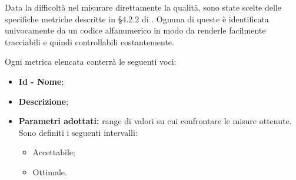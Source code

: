 Data la difficoltà nel misurare direttamente la qualità, sono state scelte delle specifiche metriche descritte in §4.2.2 di \NdP. 
Ognuna di queste è identificata univocamente da un codice alfanumerico in modo da renderle facilmente tracciabili e quindi controllabili costantemente.

Ogni metrica elencata conterrà le seguenti voci:
\begin{itemize}
	\item \textbf{Id - Nome};
	\item \textbf{Descrizione};
	\item \textbf{Parametri adottati: }range di valori su cui confrontare le misure ottenute. Sono definiti i seguenti intervalli:
	\begin{itemize}
		\item Accettabile;
		\item Ottimale.
	\end{itemize}		
	
\end{itemize}